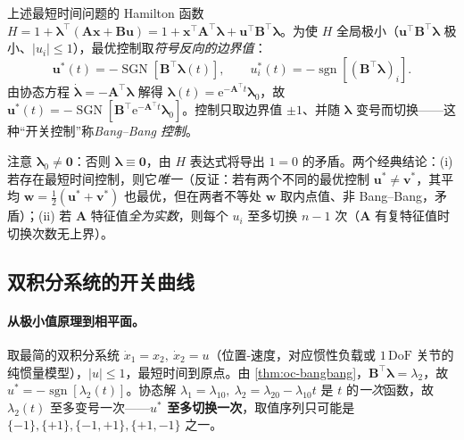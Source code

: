 \begin{theorem}\label{thm:oc-bangbang}
上述最短时间问题的 Hamilton 函数 $H=1+\boldsymbol\lambda^\top(\mathbf A\mathbf x+\mathbf B\mathbf u)=1+\mathbf x^\top\mathbf A^\top\boldsymbol\lambda+\mathbf u^\top\mathbf B^\top\boldsymbol\lambda$。为使 $H$ 全局极小（$\mathbf u^\top\mathbf B^\top\boldsymbol\lambda$ 极小、$|u_i|\le1$），最优控制取\emph{符号反向的边界值}：
\begin{equation}
  \boxed{\mathbf u^*(t)=-\operatorname{SGN}[\mathbf B^\top\boldsymbol\lambda(t)],\qquad u_i^*(t)=-\operatorname{sgn}[(\mathbf B^\top\boldsymbol\lambda)_i].}
  \label{eq:oc-bangbang-u}
\end{equation}
由协态方程 $\dot{\boldsymbol\lambda}=-\mathbf A^\top\boldsymbol\lambda$ 解得 $\boldsymbol\lambda(t)=\mathrm e^{-\mathbf A^\top t}\boldsymbol\lambda_0$，故 $\mathbf u^*(t)=-\operatorname{SGN}[\mathbf B^\top\mathrm e^{-\mathbf A^\top t}\boldsymbol\lambda_0]$。控制只取边界值 $\pm1$、并随 $\boldsymbol\lambda$ 变号而切换——这种“开关控制”称\emph{Bang--Bang 控制}。
\end{theorem}

\noindent 注意 $\boldsymbol\lambda_0\ne\mathbf0$：否则 $\boldsymbol\lambda\equiv\mathbf0$，由 $H$ 表达式将导出 $1=0$ 的矛盾。两个经典结论：(i) 若存在最短时间控制，则它\emph{唯一}（反证：若有两个不同的最优控制 $\mathbf u^*\ne\mathbf v^*$，其平均 $\mathbf w=\tfrac12(\mathbf u^*+\mathbf v^*)$ 也最优，但在两者不等处 $\mathbf w$ 取内点值、非 Bang--Bang，矛盾）；(ii) 若 $\mathbf A$ 特征值\emph{全为实数}，则每个 $u_i$ 至多切换 $n-1$ 次（$\mathbf A$ 有复特征值时切换次数无上界）。

\subsection{双积分系统的开关曲线}
\label{sec:oc-double-int-bb}

\paragraph{从极小值原理到相平面。}
取最简的双积分系统 $\dot x_1=x_2,\ \dot x_2=u$（位置-速度，对应惯性负载或 $1\,\mathrm{DoF}$ 关节的纯惯量模型），$|u|\le1$，最短时间到原点。由 \cref{thm:oc-bangbang}，$\mathbf B^\top\boldsymbol\lambda=\lambda_2$，故 $u^*=-\operatorname{sgn}[\lambda_2(t)]$。协态解 $\lambda_1=\lambda_{10},\ \lambda_2=\lambda_{20}-\lambda_{10}t$ 是 $t$ 的\emph{一次}函数，故 $\lambda_2(t)$ 至多变号一次——\textbf{$u^*$ 至多切换一次}，取值序列只可能是 $\{-1\},\{+1\},\{-1,+1\},\{+1,-1\}$ 之一。


